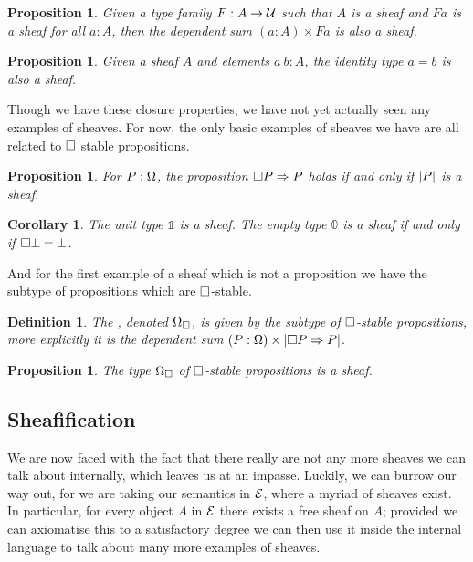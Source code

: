 \documentclass[11pt]{article}
\newtheorem{prop}[thrm]{Proposition}
\newtheorem{defn}[thrm]{Definition}
\newtheorem{coro}[thrm]{Corollary}
\begin{document}
\begin{prop}%
\label{prop:sums-preserve-sheaf}
  Given a type family \(F : A \to \mathcal{U}\) such that \(A\) is a sheaf and \(Fa\)
  is a sheaf for all \(a : A\), then the dependent sum \((a : A) \times Fa\)
  is also a sheaf.
\end{prop}

\begin{prop}
  Given a sheaf \(A\) and elements \(a\ b : A\), the identity type \(a = b\) is
  also a sheaf.
\end{prop}

Though we have these closure properties, we have not yet actually seen
any examples of sheaves.
%
For now, the only basic examples of sheaves we have are all related to
\(\Box\) stable propositions.

\begin{prop}\label{prop:t-stable-iff-sheaf}
  For \(P : \Omega\), the proposition \({\Box{P}}\Rightarrow{P}\) holds if and
  only if \(|{P}|\) is a sheaf.
\end{prop}

\begin{coro}
  The unit type \(\mathbb{1}\) is a sheaf. The empty type
  \(\mathbb{0}\) is a sheaf if and only if \(\Box{\bot} = \bot\).
\end{coro}

And for the first example of a sheaf which is not a proposition we
have the subtype of propositions which are \(\Box\)-stable.

\begin{defn}
  The , denoted \(\Omega_\Box\), is
  given by the subtype of \(\Box\)-stable propositions, more explicitly it
  is the dependent sum \((P : \Omega) \times |{{\Box{P}}\Rightarrow{P}}|\).
\end{defn}

\begin{prop}
  The type \(\Omega_\Box\) of \(\Box\)-stable propositions is a sheaf.
\end{prop}

\subsection{Sheafification}%
\label{sub:sheafification-internal}

We are now faced with the fact that there really are not any more sheaves we
can talk about internally, which leaves us at an impasse.
%
Luckily, we can burrow our way out, for we are taking our semantics in \(\mathcal{E}\),
where a myriad of sheaves exist.
%
In particular, for every object \(A\) in \(\mathcal{E}\) there exists a free sheaf on
\(A\); provided we can axiomatise this to a satisfactory degree we can then use
it inside the internal language to talk about many more examples of sheaves.
\end{document}
